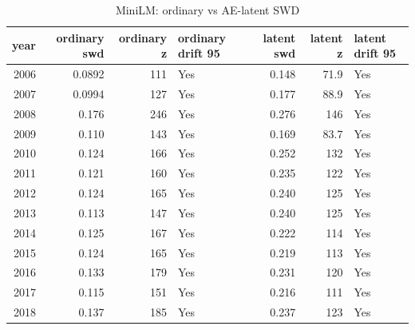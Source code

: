 \begin{table}[ht]
\centering
\caption{MiniLM: ordinary vs AE-latent SWD}
\label{tab:minilm_ordinary_vs_latent_swd}
\begin{tabular}{rrrlrrl}
\toprule
year & ordinary swd & ordinary z & ordinary drift 95 & latent swd & latent z & latent drift 95 \\
\midrule
2006 & 0.0892 & 111 & Yes & 0.148 & 71.9 & Yes \\
2007 & 0.0994 & 127 & Yes & 0.177 & 88.9 & Yes \\
2008 & 0.176 & 246 & Yes & 0.276 & 146 & Yes \\
2009 & 0.110 & 143 & Yes & 0.169 & 83.7 & Yes \\
2010 & 0.124 & 166 & Yes & 0.252 & 132 & Yes \\
2011 & 0.121 & 160 & Yes & 0.235 & 122 & Yes \\
2012 & 0.124 & 165 & Yes & 0.240 & 125 & Yes \\
2013 & 0.113 & 147 & Yes & 0.240 & 125 & Yes \\
2014 & 0.125 & 167 & Yes & 0.222 & 114 & Yes \\
2015 & 0.124 & 165 & Yes & 0.219 & 113 & Yes \\
2016 & 0.133 & 179 & Yes & 0.231 & 120 & Yes \\
2017 & 0.115 & 151 & Yes & 0.216 & 111 & Yes \\
2018 & 0.137 & 185 & Yes & 0.237 & 123 & Yes \\
\bottomrule
\end{tabular}
\end{table}
